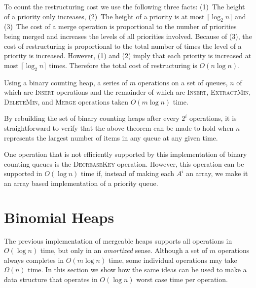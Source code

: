 To count the restructuring cost we use the following three facts:
(1)~The height of a priority only increases, (2)~The height of a
priority is at most $\lceil\log_2 n\rceil$ and (3)~The cost of a merge
operation is proportional to the number of priorities being merged and
increases the levels of all priorities involved.  Because of (3), the
cost of restructuring is proportional to the total number of times the
level of a priority is increased.  However, (1) and (2) imply that
each priority is increased at most $\lceil\log_2 n\rceil$ times.
Therefore the total cost of restructuring is $O(n\log n)$.

\begin{thm}
Using a binary counting heap, a series of $m$ operations on a set of
queues, $n$ of which are \textsc{Insert} operations and the remainder
of which are \textsc{Insert}, \textsc{ExtractMin}, \textsc{DeleteMin},
and \textsc{Merge} operations taken $O(m\log n)$ time.
\end{thm}

\begin{rem}
By rebuilding the set of binary counting heaps after every $2^i$
operations, it is straightforward to verify that the above theorem can
be made to hold when $n$ represents the largest number of items in any
queue at any given time.
\end{rem}

\begin{rem}
One operation that is not efficiently supported by this implementation
of binary counting queues is the \textsc{DecreaseKey} operation.
However, this operation can be supported in $O(\log n)$ time if,
instead of making each $A^i$ an array, we make it an array based
implementation of a priority queue.
\end{rem}

\section{Binomial Heaps}

The previous implementation of mergeable heaps supports all operations
in $O(\log n)$ time, but only in an \emph{amortized} sense.  Although
a set of $m$ operations always completes in $O(m\log n)$ time, some
individual operations may take $\Omega(n)$ time.  In this section we
show how the same ideas can be used to make a data structure that
operates in $O(\log n)$ worst case time per operation.

